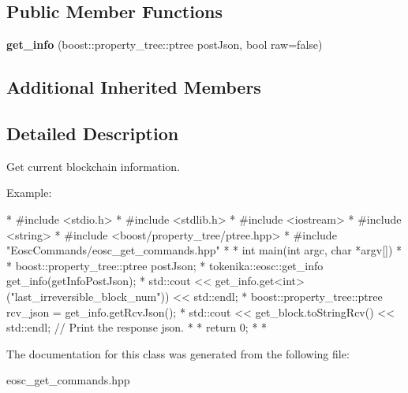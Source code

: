 \subsection*{Public Member Functions}
\begin{DoxyCompactItemize}
\item 
\mbox{\label{classtokenika_1_1eosc_1_1get__info_a19fc7b68763a4dca69ac63d8f859f9fd}} 
{\bfseries get\+\_\+info} (boost\+::property\+\_\+tree\+::ptree post\+Json, bool raw=false)
\end{DoxyCompactItemize}
\subsection*{Additional Inherited Members}


\subsection{Detailed Description}
Get current blockchain information. 

Example\+:

\begin{DoxyVerb}* #include <stdio.h>
* #include <stdlib.h>
* #include <iostream>
* #include <string>
* #include <boost/property_tree/ptree.hpp>
* #include "EoscCommands/eosc_get_commands.hpp"
* 
* int main(int argc, char *argv[])
* {
* boost::property_tree::ptree postJson;
* tokenika::eosc::get_info get_info(getInfoPostJson);
* std::cout << get_info.get<int>("last_irreversible_block_num")) << std::endl;
* boost::property_tree::ptree rcv_json = get_info.getRcvJson();
* std::cout << get_block.toStringRcv() << std::endl; // Print the response json.
* 
* return 0;
* }
* \end{DoxyVerb}
 

The documentation for this class was generated from the following file\+:\begin{DoxyCompactItemize}
\item 
eosc\+\_\+get\+\_\+commands.\+hpp\end{DoxyCompactItemize}
